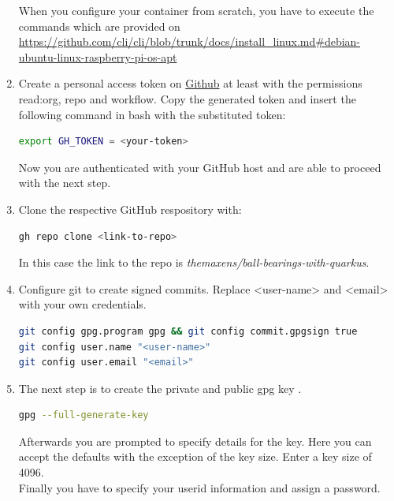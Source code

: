\begin{enumerate}
        When you configure your container from scratch, you have to execute the commands which are provided on \url{https://github.com/cli/cli/blob/trunk/docs/install_linux.md#debian-ubuntu-linux-raspberry-pi-os-apt}
        \item Create a personal access token on \href{https://github.com/settings/tokens}{Github} at least with the permissions read:org, repo and workflow. Copy the generated token and insert the following command in \ac{bash} with the substituted token: 
            \begin{lstlisting}[language=bash] 
export GH_TOKEN = <your-token>
            \end{lstlisting}   
        Now you are authenticated with your GitHub host and are able to proceed with the next step.
        \item Clone the respective GitHub respository with: 
            \begin{lstlisting}[language=bash] 
gh repo clone <link-to-repo>  
            \end{lstlisting} 
            In this case the link to the repo is \textit{themaxens/ball-bearings-with-quarkus}.
        \item Configure git to create signed commits. Replace <user-name> and <email> with your own credentials. 
            \begin{lstlisting}[language=bash] 
git config gpg.program gpg && git config commit.gpgsign true
git config user.name "<user-name>"
git config user.email "<email>"
            \end{lstlisting}
        \item The next step is to create the private and public \ac{gpg} key \autocite[vgl.][]{create_gpg}.
            \begin{lstlisting}[language=bash] 
gpg --full-generate-key 
            \end{lstlisting} 
        Afterwards you are prompted to specify details for the key. Here you can accept the defaults with the exception of the key size. Enter a key size of 4096. \\
        Finally you have to specify your userid information and assign a password. 

\end{enumerate}
